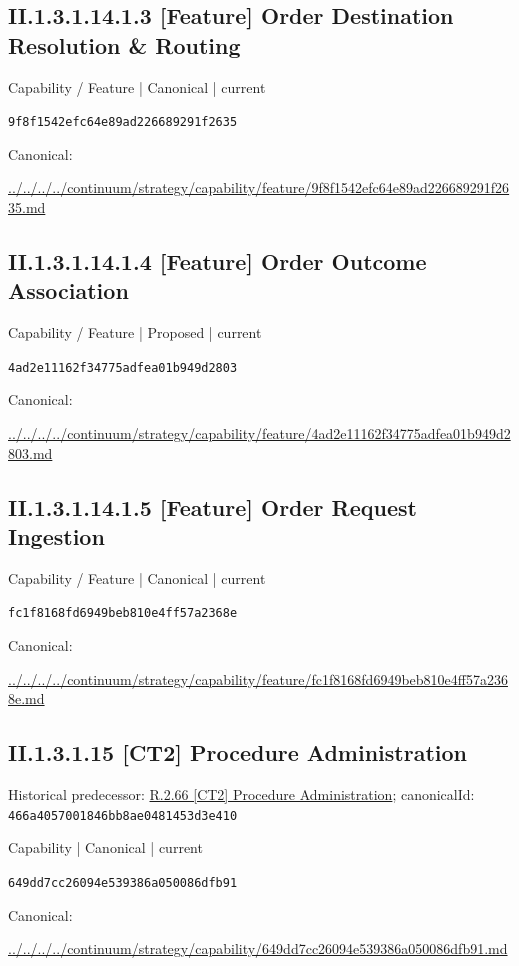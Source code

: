 \documentclass[10pt,a4paper]{article}
\begin{document}
\subsection*{II.1.3.1.14.1.3 [Feature] Order Destination Resolution \& Routing}
\label{element-9f8f1542efc64e89ad226689291f2635}
{\small Capability / Feature | Canonical | current}\par
\texttt{9f8f1542efc64e89ad226689291f2635}\par
Canonical: \par
{\footnotesize\url{../../../../continuum/strategy/capability/feature/9f8f1542efc64e89ad226689291f2635.md}}\par
\subsection*{II.1.3.1.14.1.4 [Feature] Order Outcome Association}
\label{element-4ad2e11162f34775adfea01b949d2803}
{\small Capability / Feature | Proposed | current}\par
\texttt{4ad2e11162f34775adfea01b949d2803}\par
Canonical: \par
{\footnotesize\url{../../../../continuum/strategy/capability/feature/4ad2e11162f34775adfea01b949d2803.md}}\par
\subsection*{II.1.3.1.14.1.5 [Feature] Order Request Ingestion}
\label{element-fc1f8168fd6949beb810e4ff57a2368e}
{\small Capability / Feature | Canonical | current}\par
\texttt{fc1f8168fd6949beb810e4ff57a2368e}\par
Canonical: \par
{\footnotesize\url{../../../../continuum/strategy/capability/feature/fc1f8168fd6949beb810e4ff57a2368e.md}}\par
\subsection*{II.1.3.1.15 [CT2] Procedure Administration}
Historical predecessor: \hyperref[element-466a4057001846bb8ae0481453d3e410]{R.2.66 [CT2] Procedure Administration}; canonicalId: \texttt{466a4057001846bb8ae0481453d3e410}\par
\label{element-649dd7cc26094e539386a050086dfb91}
{\small Capability | Canonical | current}\par
\texttt{649dd7cc26094e539386a050086dfb91}\par
Canonical: \par
{\footnotesize\url{../../../../continuum/strategy/capability/649dd7cc26094e539386a050086dfb91.md}}\par
\end{document}
